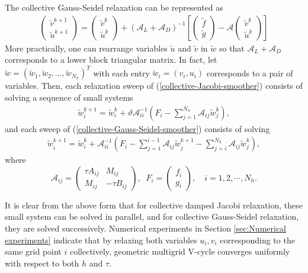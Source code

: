 \documentclass[smallcondensed]{svjour3}
\numberwithin{equation}{section} \numberwithin{table}{section}
\numberwithin{figure}{section}
\numberwithin{algorithm}{section}
\begin{document}
The collective Gauss-Seidel relaxation can be represented as
\begin{align}\label{collective-Gauss-Seidel-smoother}
\begin{pmatrix}
\utilde{v}^{k+1}\\
\utilde{u}^{k+1}
\end{pmatrix}
=\begin{pmatrix}
 \utilde{v}^{k}\\
\utilde{u}^{k}
\end{pmatrix}
+
(\mathcal{A}_L+\mathcal{A}_D)^{-1}
\left[\begin{pmatrix}
 \utilde{f}\\
 \utilde{g}
\end{pmatrix}
-\mathcal{A}
\begin{pmatrix}
 \utilde{v}^{k}\\
\utilde{u}^{k}
\end{pmatrix}\right]
\end{align}
More practically, one can rearrange variables $\utilde{u}$ and $\utilde{v}$ in $\utilde{w}$ so that $\mathcal{A}_L+\mathcal{A}_D$ corresponds to a lower block triangular matrix. In fact, let $\utilde{w}=(\utilde{w}_1, \utilde{w}_2, \dots, \utilde{w}_{N_h})^T$ with each entry $\utilde{w}_i=(v_i, u_i)$ corresponds to a pair of variables. Then, each relaxation sweep of (\ref{collective-Jacobi-smoother}) consists of solving a sequence of small systems
\begin{align*}
\utilde{w}_i^{k+1} = \utilde{w}^{k}_i +\vartheta \mathscr{A}^{-1}_{ii}\left(F_i-\sum_{j=1}^{N_h}\mathscr{A}_{ij}\utilde{w}^{k}_j\right),
\end{align*}
and each sweep of (\ref{collective-Gauss-Seidel-smoother}) consists of solving
\begin{align*}
\utilde{w}_i^{k+1} = \utilde{w}^{k}_i +\mathscr{A}^{-1}_{ii}\left(F_i-\sum_{j=1}^{i-1}\mathscr{A}_{ij}\utilde{w}^{k+1}_j-\sum_{j=i}^{N_h}\mathscr{A}_{ij}\utilde{w}^{k}_j\right),
\end{align*} 
where
$$
\mathscr{A}_{ij} = 
\begin{pmatrix}
\tau A _{ij}& M_{ij}\\
M_{ij} & -\tau B_{ij}
\end{pmatrix},\;\;
F_i = 
\begin{pmatrix}
f_i \\
g_i
\end{pmatrix},\quad i = 1,2,\cdots, N_h.
$$

It is clear from the above form that 
for collective damped Jacobi relaxation, these small system can be solved in parallel, and for collective Gauss-Seidel relaxation, they are solved successively. Numerical experiments in Section \ref{sec:Numerical experiments} indicate that by relaxing both variables $u_i,v_i$ corresponding to the same grid point $i$ collectively, geometric multigrid V-cycle converges uniformly with respect to both $h$ and $\tau$.
\end{document}
